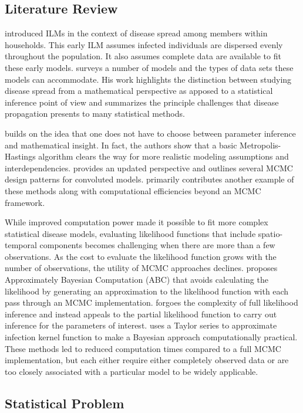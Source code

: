 \documentclass{uwstat572}
\begin{document}
\subsection{Literature Review}
\citet{Haber} introduced ILMs in the context of disease spread among members within households. 
This early ILM assumes infected individuals are dispersed evenly throughout the population. 
It also assumes complete data are available to fit these early models. 
\citet{Becker} surveys a number of models and the types of data sets these models can accommodate. 
His work highlights the distinction between studying disease spread from a mathematical perspective as apposed to a statistical inference point of view and summarizes the principle challenges that disease propagation presents to many statistical methods.

\citet{ONeill} builds on the idea that one does not have to choose between parameter inference and mathematical insight. 
In fact, the authors show that a basic Metropolis-Hastings algorithm clears the way for more realistic modeling assumptions and interdependencies. 
\citet{Jewell} provides an updated perspective and outlines several MCMC design patterns for convoluted models.
\citet{Brown} primarily contributes another example of these methods along with computational efficiencies beyond an MCMC framework. 

While improved computation power made it possible to fit more complex statistical disease models, evaluating likelihood functions that include spatio-temporal components becomes challenging when there are more than a few observations. 
As the cost to evaluate the likelihood function grows with the number of observations, the utility of MCMC approaches declines.
\citet{McKinley} proposes Approximately Bayesian Computation (ABC) that avoids calculating the likelihood by generating an approximation to the likelihood function with each pass through an MCMC implementation. 
\citet{Diggle} forgoes the complexity of full likelihood inference and instead appeals to the partial likelihood function to carry out inference for the parameters of interest. 
\citet{Deardon} uses a Taylor series to approximate infection kernel function to make a Bayesian approach computationally practical. 
These methods led to reduced computation times compared to a full MCMC implementation, but each either require either completely observed data or are too closely associated with a particular model to be widely applicable.

\subsection{Statistical Problem}
\end{document}
